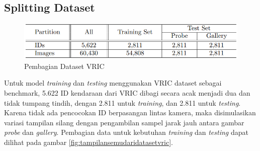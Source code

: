 \subsection{Splitting Dataset}

\begin{figure}[h!]
  \centering
  \includegraphics[scale=0.8]{gambar/Pembagian dataset VRIC.png}
  \caption{Pembagian Dataset VRIC}
  \label{fig:pembagiandatasetvric}
\end{figure}

Untuk model \emph{training} dan \emph{testing} menggunakan VRIC dataset sebagai benchmark, 5.622 ID kendaraan dari VRIC dibagi secara acak menjadi dua dan tidak tumpang tindih, dengan 
2.811 untuk \emph{training}, dan 2.811 untuk \emph{testing}. Karena tidak ada pencocokan ID berpasangan lintas kamera, maka disimulasikan variasi tampilan silang dengan pengambilan 
sampel jarak jauh antara gambar \emph{probe} dan \emph{gallery}.\parencite{Kanaci2018} Pembagian data untuk kebutuhan \emph{training} dan \emph{testing} dapat dilihat pada gambar 
\ref{fig:tampilansemudaridatasetvric}.

